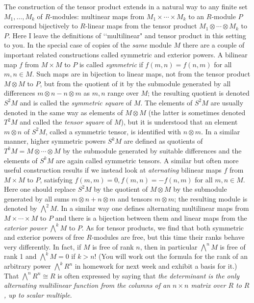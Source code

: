 \documentclass[10pt]{article}
\begin{document}
The construction of the tensor product extends in a natural way to any
finite set $M_1,\ldots,M_k$ of $R$-modules: multinear maps from
$M_1\times\cdots\times M_k$ to an $R$-module $P$ correspond bijectively
to $R$-linear maps from the tensor product $M_1\otimes\cdots\otimes M_k$
to $P$. Here I leave the definitions of \lq\lq multilinear" and tensor
product in this setting to you. In the special case of copies of the
{\sl same} module $M$ there are a couple of important related
constructions called symmetric and exterior powers. A bilinear map $f$
from $M\times M$ to $P$ is called {\sl symmetric} if $f(m,n) = f(n,m)$
for all $m,n\in M$. Such maps are in bijection to linear maps, not from
the tensor product $M\otimes M$ to $P$, but from the quotient of it by
the submodule generated by all differences $m\otimes n - n\otimes m$ as
$m,n$ range over $M$; the resulting quotient is denoted $S^2 M$ and is
called the {\sl symmetric square} of $M$. The elements of $S^2 M$ are
usually denoted in the same way as elements of $M\otimes M$ (the latter
is sometimes denoted $T^2 M$ and called the {\sl tensor square} of $M$),
but it is understood that an element $m\otimes n$ of $S^2 M$, called a
symmetric tensor, is identified with $n\otimes m$. In a similar manner,
higher symmetric powers $S^k M$ are defined as quotients of $T^k M =
M\otimes\cdots\otimes M$ by the submodule generated by suitable
differences and the elements of $S^k M$ are again called symmetric
tensors. A similar but often more useful construction results if we
instead look at {\sl aternating} bilinear maps $f$ from $M\times M$ to
$P$, satisfying $f(m,m) = 0, f(m,n) = -f(n,m)$ for all $m,n\in M$. Here
one should replace $S^2 M$ by the quotient of $M\otimes M$ by the
submodule generated by all sums $m\otimes n + n\otimes m$ and tensors
$m\otimes m$; the resulting module is denoted by $\bigwedge^2 M$. In a
similar way one defines alternating multilinear maps from
$M\times\cdots\times M$ to $P$ and there is a bijection between them and
linear maps from the {\sl exterior power} $\bigwedge^k M$ to $P$. As for
tensor products, we find that both symmetric and exterior powers of free
$R$-modules are free, but this time their ranks behave very differently.
In fact, if $M$ is free of rank $n$, then in particular $\bigwedge^n M$
is free of rank 1 and $\bigwedge^k M = 0$ if $k>n$! (You will work out
the formula for the rank of an arbitrary power $\bigwedge^k R^n$ in
homework for next week and exhibit a basis for it.) That $\bigwedge^n
R^n\cong R$ is often expressed by saying that {\sl the determinant is
  the only alternating multilinear function from the columns of an
  $n\times n$ matrix over $R$ to $R$, up to scalar multiple}.
\end{document}
